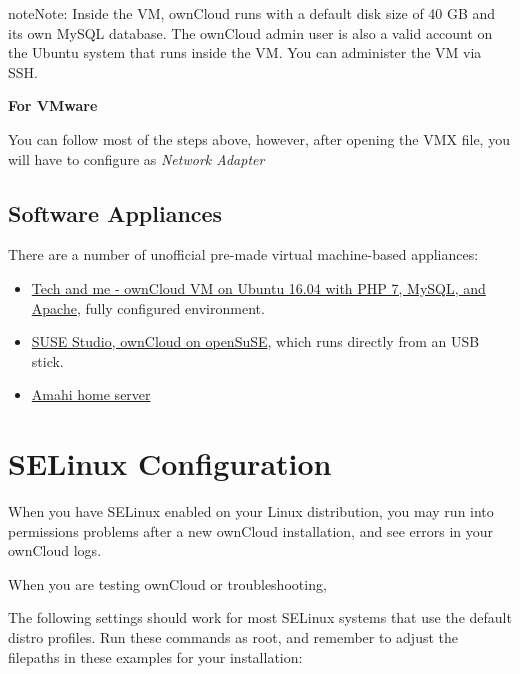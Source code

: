 \documentclass[letterpaper,10pt,english]{sphinxmanual}
\begin{document}
\begin{notice}{note}{Note:}
Inside the VM, ownCloud runs with a default disk size of 40 GB and its
own MySQL database. The ownCloud admin user is also a valid account on the
Ubuntu system that runs inside the VM. You can administer the VM via SSH.
\end{notice}

\textbf{For VMware}

You can follow most of the steps above, however, after opening the VMX file, you will have to configure  as \emph{Network Adapter}


\subsection{Software Appliances}
\label{installation/appliance_installation:software-appliances}
There are a number of unofficial pre-made virtual machine-based appliances:
\begin{itemize}
\item {} 
\href{https://www.techandme.se/pre-configured-owncloud-installaton/}{Tech and me - ownCloud VM on Ubuntu 16.04 with PHP 7, MySQL, and Apache}, fully configured
environment.

\item {} 
\href{http://susestudio.com/a/TadMax/owncloud-in-a-box}{SUSE Studio, ownCloud on openSuSE}, which runs directly from an USB stick.

\item {} 
\href{https://wiki.amahi.org/index.php/OwnCloud}{Amahi home server}

\end{itemize}


\section{SELinux Configuration}
\label{installation/selinux_configuration:selinux-config-label}\label{installation/selinux_configuration:synology-package}\label{installation/selinux_configuration::doc}\label{installation/selinux_configuration:selinux-configuration}
When you have SELinux enabled on your Linux distribution, you may run into
permissions problems after a new ownCloud installation, and see  errors in your ownCloud logs.

When you are testing ownCloud or troubleshooting,

The following settings should work for most SELinux systems that use the
default distro profiles. Run these commands as root, and remember to adjust the filepaths
in these examples for your installation:
\end{document}
